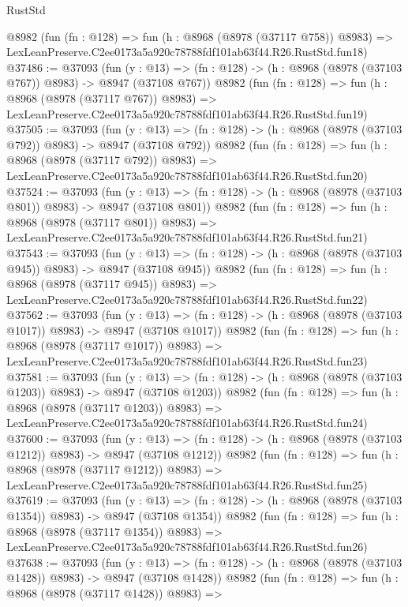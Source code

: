 \begin{lexlean}{RustStd}
\begin{coremodule}
    @8982
    (fun (fn : @128) =>
    fun (h : @8968 (@8978 (@37117 @758)) @8983) =>
    LexLeanPreserve.C2ee0173a5a920c78788fdf101ab63f44.R26.RustStd.fun18)
@37486 := @37093
    (fun (y : @13) => (fn : @128) -> (h : @8968 (@8978 (@37103 @767)) @8983) -> @8947 (@37108 @767))
    @8982
    (fun (fn : @128) =>
    fun (h : @8968 (@8978 (@37117 @767)) @8983) =>
    LexLeanPreserve.C2ee0173a5a920c78788fdf101ab63f44.R26.RustStd.fun19)
@37505 := @37093
    (fun (y : @13) => (fn : @128) -> (h : @8968 (@8978 (@37103 @792)) @8983) -> @8947 (@37108 @792))
    @8982
    (fun (fn : @128) =>
    fun (h : @8968 (@8978 (@37117 @792)) @8983) =>
    LexLeanPreserve.C2ee0173a5a920c78788fdf101ab63f44.R26.RustStd.fun20)
@37524 := @37093
    (fun (y : @13) => (fn : @128) -> (h : @8968 (@8978 (@37103 @801)) @8983) -> @8947 (@37108 @801))
    @8982
    (fun (fn : @128) =>
    fun (h : @8968 (@8978 (@37117 @801)) @8983) =>
    LexLeanPreserve.C2ee0173a5a920c78788fdf101ab63f44.R26.RustStd.fun21)
@37543 := @37093
    (fun (y : @13) => (fn : @128) -> (h : @8968 (@8978 (@37103 @945)) @8983) -> @8947 (@37108 @945))
    @8982
    (fun (fn : @128) =>
    fun (h : @8968 (@8978 (@37117 @945)) @8983) =>
    LexLeanPreserve.C2ee0173a5a920c78788fdf101ab63f44.R26.RustStd.fun22)
@37562 := @37093
    (fun (y : @13) =>
    (fn : @128) -> (h : @8968 (@8978 (@37103 @1017)) @8983) -> @8947 (@37108 @1017))
    @8982
    (fun (fn : @128) =>
    fun (h : @8968 (@8978 (@37117 @1017)) @8983) =>
    LexLeanPreserve.C2ee0173a5a920c78788fdf101ab63f44.R26.RustStd.fun23)
@37581 := @37093
    (fun (y : @13) =>
    (fn : @128) -> (h : @8968 (@8978 (@37103 @1203)) @8983) -> @8947 (@37108 @1203))
    @8982
    (fun (fn : @128) =>
    fun (h : @8968 (@8978 (@37117 @1203)) @8983) =>
    LexLeanPreserve.C2ee0173a5a920c78788fdf101ab63f44.R26.RustStd.fun24)
@37600 := @37093
    (fun (y : @13) =>
    (fn : @128) -> (h : @8968 (@8978 (@37103 @1212)) @8983) -> @8947 (@37108 @1212))
    @8982
    (fun (fn : @128) =>
    fun (h : @8968 (@8978 (@37117 @1212)) @8983) =>
    LexLeanPreserve.C2ee0173a5a920c78788fdf101ab63f44.R26.RustStd.fun25)
@37619 := @37093
    (fun (y : @13) =>
    (fn : @128) -> (h : @8968 (@8978 (@37103 @1354)) @8983) -> @8947 (@37108 @1354))
    @8982
    (fun (fn : @128) =>
    fun (h : @8968 (@8978 (@37117 @1354)) @8983) =>
    LexLeanPreserve.C2ee0173a5a920c78788fdf101ab63f44.R26.RustStd.fun26)
@37638 := @37093
    (fun (y : @13) =>
    (fn : @128) -> (h : @8968 (@8978 (@37103 @1428)) @8983) -> @8947 (@37108 @1428))
    @8982
    (fun (fn : @128) =>
    fun (h : @8968 (@8978 (@37117 @1428)) @8983) =>

\end{coremodule}
\end{lexlean}
